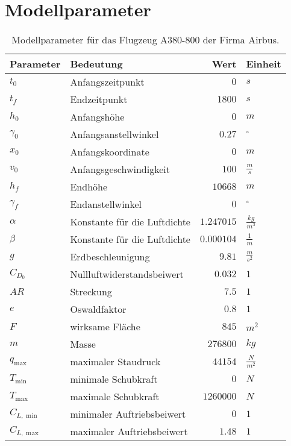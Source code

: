 \chapter{Modellparameter}\label{Anhang:ModellPara}

\begin{table}[H]
    \centering
    \caption{Modellparameter für das Flugzeug A380-800 der Firma Airbus.}\label{tab:ProblemPara}
    \begin{tabularx}{.9\textwidth}{lXrl}
        \toprule
        \textbf{Parameter}   & \textbf{Bedeutung} & \textbf{Wert} & \textbf{Einheit} \\ 
        \midrule
        $t_0$       & Anfangszeitpunkt & $0$ & $s$ \\ 
        $t_f$       & Endzeitpunkt & $1800$ & $s$ \\ 
        \hline
        $h_0$       & Anfangshöhe & $0$ & $m$ \\ 
        $\gamma_0$  & Anfangsanstellwinkel & $0.27$ & $^{\circ}$ \\
        $x_0$       & Anfangskoordinate & $0$ & $m$ \\ 
        $v_0$       & Anfangsgeschwindigkeit & $100$ & $\frac{m}{s}$ \\ 
        \hline
        $h_f$       & Endhöhe & $10668$ & $m$ \\ 
        $\gamma_f$  & Endanstellwinkel & $0$ & $^{\circ}$ \\
        \hline
        $\alpha$    & Konstante für die Luftdichte & $1.247015$ & $\frac{kg}{m^3}$\\ 
        $\beta$     & Konstante für die Luftdichte & $0.000104$ & $\frac{1}{m}$\\
        $g$         & Erdbeschleunigung & $9.81$ & $\frac{m}{s^2}$ \\ 
        $C_{D_0}$   & Nullluftwiderstandsbeiwert & $0.032$ & $1$\\ 
        $AR$        & Streckung & $7.5$ & $1$\\ 
        $e$         & Oswaldfaktor & $0.8$ & $1$\\ 
        $F$         & wirksame Fläche & $845$ & $m^2$ \\ 
        $m$         & Masse & $276800$ & $kg$ \\ 
        $q_{\max}$  & maximaler Staudruck & $44154$ & $\frac{N}{m^2}$ \\
        $T_{\min}$  & minimale Schubkraft & $0$ & $N$ \\  
        $T_{\max}$  & maximale Schubkraft & $1260000$ & $N$ \\ 
        $C_{L, \min}$ & minimaler Auftriebsbeiwert & $0$ & $1$ \\ 
        $C_{L, \max}$ & maximaler Auftriebsbeiwert & $1.48$ & $1$ \\ 
        \bottomrule
    \end{tabularx} 
\end{table}

